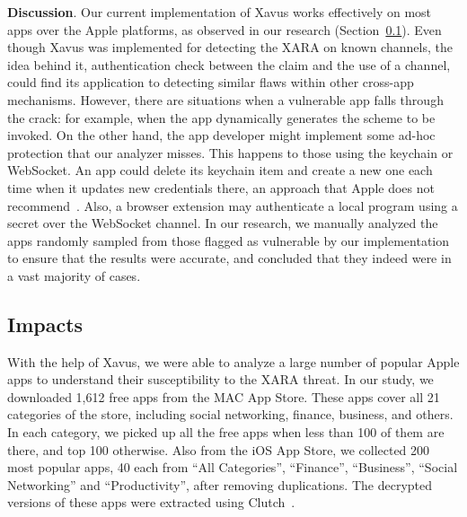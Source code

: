 \documentclass{article}
\newcommand{\ignore}[1]{}
\begin{document}
\vspace {3pt}\noindent\textbf{Discussion}. Our current implementation of Xavus works effectively on most apps over the Apple platforms, as observed in our research (Section~\ref{subsec:impact}).  \ignore{Xavus can not only inspect all the cross-app interactions channels discussed in this research, its design also make it scalable to detect missing authentications in other cross-app channels once the features to fingerprint the authentications for that channel are established.}Even though Xavus was implemented for detecting the XARA on known channels,  the idea behind it,  authentication check between the claim and the use of a channel,  could find its application to detecting similar flaws within other cross-app mechanisms. However, there are situations when a vulnerable app falls through the crack: for example, when the app dynamically generates the scheme to be invoked.  On the other hand, the app developer might implement some ad-hoc protection that our analyzer misses. This happens to those using the keychain or WebSocket. An app could delete its keychain item and create a new one each time when it updates new credentials there, an approach that Apple does not recommend~\cite{kcitemdelete}.  \ignore{An app can choose a secret attribute for its keychain item, making it unpredictable to the adversary, as did by Apple to protect its Internet Accounts, in response to our finding.} Also, a browser extension may authenticate a local program using a secret over the WebSocket channel.  In our research, we manually analyzed the apps randomly sampled from those flagged as vulnerable by our implementation to ensure that the results were accurate, and concluded that they indeed were in a vast majority of cases.

\vspace {-5pt}
\subsection{Impacts}
\label{subsec:impact}



With the help of Xavus, we were able to analyze a large number of popular Apple apps to understand their susceptibility to the XARA threat. In our study, we downloaded 1,612 free apps from the MAC App Store. These apps cover all 21 categories of the store, including social networking, finance, business, and others. In each category, we picked up all the free apps when less than 100 of them are there, and top 100 otherwise.  Also from the iOS App Store, we collected 200 most popular apps, 40 each from ``All Categories'', ``Finance'', ``Business'', ``Social Networking'' and ``Productivity'', after removing duplications. The decrypted versions of these apps were extracted using Clutch~\cite{Clutch}.
\end{document}
